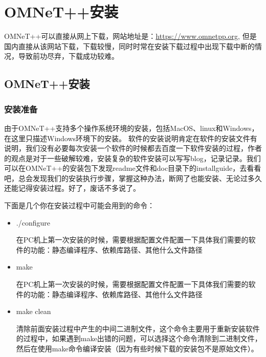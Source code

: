 \chapter{OMNeT++安装}

\begin{summary}
 OMNeT++可以直接从网上下载，网站地址是：\url{https://www.omnetpp.org},
 但是国内直接从该网站下载，下载较慢，同时时常在安装下载过程中出现下载中断的情况，导致前功尽弃，下载成功较难。\\
\end{summary}

\section{OMNeT++安装}

\subsection{安装准备}
由于OMNeT++支持多个操作系统环境的安装，包括MacOS、linux和Windows，在这里只描述Windows环境下的安装。
软件的安装说明肯定在软件的安装文件有说明，我们没有必要每次安装一个软件的时候都去百度一下软件安装的过程，作者的观点是对于一些破解较难，安装复杂的软件安装可以写写blog，记录记录。我们可以在OMNeT++的安装包下发现readme文件和doc目录下的installguide，去看看吧，总会发现我们的安装执行步骤，掌握这种办法，断网了也能安装、无论过多久还能记得安装过程。好了，废话不多说了。

下面是几个你在安装过程中可能会用到的命令：
\begin{itemize}
\item ./configure

在PC机上第一次安装的时候，需要根据配置文件配置一下具体我们需要的软件的功能：静态编译程序、依赖库路径、其他什么文件路径
\item make

在PC机上第一次安装的时候，需要根据配置文件配置一下具体我们需要的软件的功能：静态编译程序、依赖库路径、其他什么文件路径
\item make clean

清除前面安装过程中产生的中间二进制文件，这个命令主要用于重新安装软件的过程中，如果遇到make出错的问题，可以选择这个命令清除到二进制文件，然后在使用make命令编译安装（因为有些时候下载的安装包不是原始文件）。

\end{itemize}

